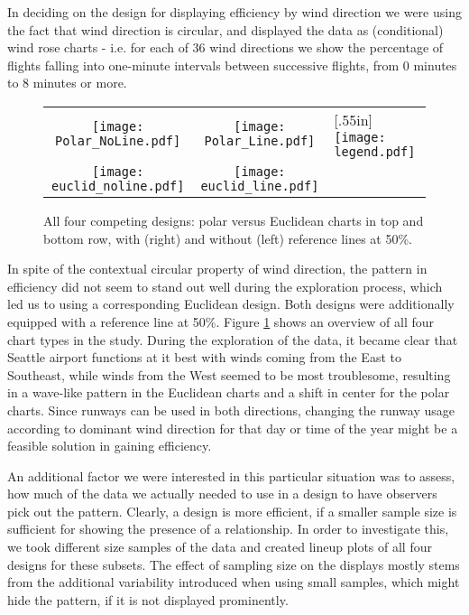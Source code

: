 In deciding on the design for displaying efficiency by wind direction we were using the fact that wind direction is circular, and  displayed the data as (conditional) wind rose charts - i.e. for each of 36 wind directions we show the percentage of flights falling into one-minute intervals between successive flights, from  0 minutes to 8 minutes or more.

\begin{figure}[htbp] %
 \hspace{-.1in}
   \begin{tabular}{ccl}
   \texttt{[image: Polar\_NoLine.pdf]} &  \hspace{-.3in}
   \texttt{[image: Polar\_Line.pdf]}  &  \hspace{-.2in} \multirow{2}{*}[.55in]{  \texttt{[image: legend.pdf]}} \\
   \texttt{[image: euclid\_noline.pdf]} & \hspace{-.3in}
   \texttt{[image: euclid\_line.pdf]}
   \end{tabular}
   \caption{All four competing designs: polar versus Euclidean charts in top and bottom row, with (right) and without (left) reference lines at 50\%. }
   \label{layouts}
\end{figure}

In spite of the contextual circular property of wind direction, the pattern in efficiency did not seem to stand out well during the exploration process, which led us to using a corresponding  Euclidean design. Both designs were additionally equipped with a reference line at 50\%. 
Figure \ref{layouts} shows an overview of all four chart types in the study. During the exploration of the data, it became clear that Seattle airport functions at it best with winds coming from the East to Southeast, while winds from the West seemed to be most troublesome, resulting in a wave-like pattern in the Euclidean charts and a shift in center for the polar charts. Since runways can be used in both directions, changing the runway usage according to dominant wind direction for that day or time of the year might be a feasible solution in gaining efficiency. 

An additional factor we were interested in this particular situation was to assess, how much of the data we actually needed to use in a design to have observers pick out the pattern. Clearly, a design is more efficient, if a smaller sample size is sufficient for showing the presence of a relationship. In order to investigate this, we took different size samples of the data and created lineup plots of all four designs for these subsets. The effect of sampling size on the displays mostly stems from the additional variability introduced when using small samples, which might hide the pattern, if it is not displayed prominently. 

